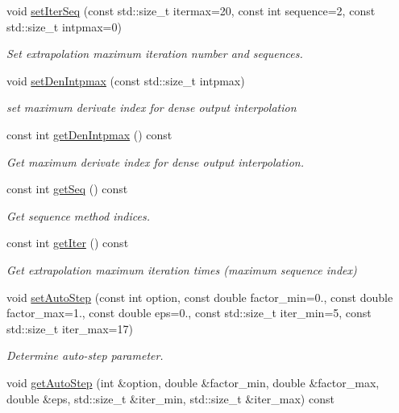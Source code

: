 \begin{DoxyCompactItemize}
void \hyperlink{classARC_1_1chainpars_a4b9a1b853f414f1dfb4ca1fc36d2178b}{set\+Iter\+Seq} (const std\+::size\+\_\+t itermax=20, const int sequence=2, const std\+::size\+\_\+t intpmax=0)
\begin{DoxyCompactList}\small\item\em Set extrapolation maximum iteration number and sequences. \end{DoxyCompactList}\item 
void \hyperlink{classARC_1_1chainpars_aa19305c22ed42da4256e968ba38df871}{set\+Den\+Intpmax} (const std\+::size\+\_\+t intpmax)
\begin{DoxyCompactList}\small\item\em set maximum derivate index for dense output interpolation \end{DoxyCompactList}\item 
const int \hyperlink{classARC_1_1chainpars_a394aa470175760d3e1f518b68067c9dc}{get\+Den\+Intpmax} () const
\begin{DoxyCompactList}\small\item\em Get maximum derivate index for dense output interpolation. \end{DoxyCompactList}\item 
const int \hyperlink{classARC_1_1chainpars_aea815f20c4efe8e93d68153e41275770}{get\+Seq} () const
\begin{DoxyCompactList}\small\item\em Get sequence method indices. \end{DoxyCompactList}\item 
const int \hyperlink{classARC_1_1chainpars_a000356820943c99de5542b04130f453f}{get\+Iter} () const
\begin{DoxyCompactList}\small\item\em Get extrapolation maximum iteration times (maximum sequence index) \end{DoxyCompactList}\item 
void \hyperlink{classARC_1_1chainpars_a12066ef8bca0ad69362d608959c9149b}{set\+Auto\+Step} (const int option, const double factor\+\_\+min=0., const double factor\+\_\+max=1., const double eps=0., const std\+::size\+\_\+t iter\+\_\+min=5, const std\+::size\+\_\+t iter\+\_\+max=17)
\begin{DoxyCompactList}\small\item\em Determine auto-\/step parameter. \end{DoxyCompactList}\item 
void \hyperlink{classARC_1_1chainpars_a4d1d61e7cb4383caa891fdc84ae5af42}{get\+Auto\+Step} (int \&option, double \&factor\+\_\+min, double \&factor\+\_\+max, double \&eps, std\+::size\+\_\+t \&iter\+\_\+min, std\+::size\+\_\+t \&iter\+\_\+max) const

\end{DoxyCompactItemize}
